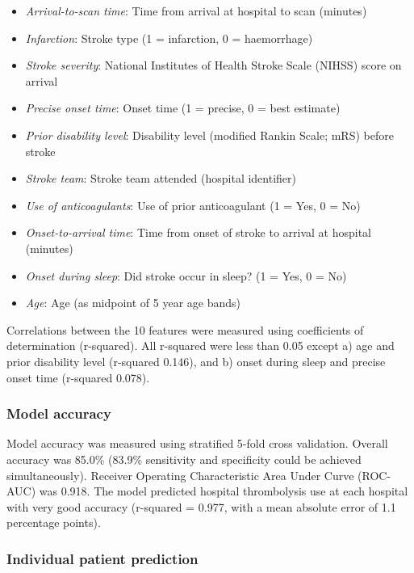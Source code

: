 \begin{itemize}
    \item \emph{Arrival-to-scan time}: Time from arrival at hospital to scan (minutes)
    \item \emph{Infarction}: Stroke type (1 = infarction, 0 = haemorrhage)
    \item \emph{Stroke severity}: National Institutes of Health Stroke Scale (NIHSS) score on arrival
    \item \emph{Precise onset time}: Onset time (1 = precise, 0 = best estimate)
    \item \emph{Prior disability level}: Disability level (modified Rankin Scale; mRS) before stroke
    \item \emph{Stroke team}: Stroke team attended (hospital identifier)
    \item \emph{Use of anticoagulants}: Use of prior anticoagulant (1 = Yes, 0 = No)
    \item \emph{Onset-to-arrival time}: Time from onset of stroke to arrival at hospital (minutes)
    \item \emph{Onset during sleep}: Did stroke occur in sleep? (1 = Yes, 0 = No)
    \item \emph{Age}: Age (as midpoint of 5 year age bands)
\end{itemize}

Correlations between the 10 features were measured using coefficients of determination (r-squared). All r-squared were less than 0.05 except a) age and prior disability level (r-squared 0.146), and b) onset during sleep and precise onset time (r-squared 0.078).

\subsubsection{Model accuracy}

Model accuracy was measured using stratified 5-fold cross validation. Overall accuracy was 85.0\% (83.9\% sensitivity and specificity could be achieved simultaneously). Receiver Operating Characteristic Area Under Curve (ROC-AUC) was 0.918. The model predicted hospital thrombolysis use at each hospital with very good accuracy (r-squared = 0.977, with a mean absolute error of 1.1 percentage points).

\subsubsection{Individual patient prediction}


